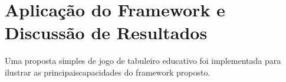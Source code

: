 \chapter{Aplicação do Framework e Discussão de Resultados}

Uma proposta simples de jogo de tabuleiro educativo foi implementada para ilustrar as principaiscapacidades do framework proposto.

\label{Resultados}

